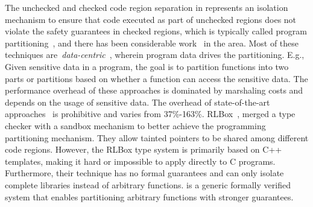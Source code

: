 %
The unchecked and checked code region separation in \systemname represents an isolation mechanism to ensure that code executed as part of unchecked regions does not violate the safety guarantees in checked regions,
which is typically called program partitioning~\cite{rul2009towards}, and there has been considerable work~\cite{tan2017principles, brumley2004privtrans, bittau2008wedge, lind2017glamdring, liu2017ptrsplit} in the area. Most of these techniques are~\emph{data-centric}~\cite{lind2017glamdring, liu2017ptrsplit}, wherein program data drives the partitioning. E.g., Given sensitive data in a program, the goal is to partition functions into two parts or partitions based on whether a function can access the sensitive data.
The performance overhead of these approaches is dominated by marshaling costs and depends on the usage of sensitive data.
The overhead of state-of-the-art approaches~\cite{lind2017glamdring, liu2017ptrsplit} is prohibitive and varies from 37\%-163\%.
%
RLBox~\cite{rlbox-paper}, merged a type checker with a sandbox mechanism to better achieve the programming partitioning mechanism.
They allow tainted pointers to be shared among different code regions. 
However, the RLBox type system is primarily based on C++ templates, making it hard or impossible to apply directly to C programs.
Furthermore, their technique has no formal guarantees and can only isolate complete libraries instead of arbitrary functions.
\systemname is a generic formally verified system that enables partitioning arbitrary functions with stronger guarantees.

%

